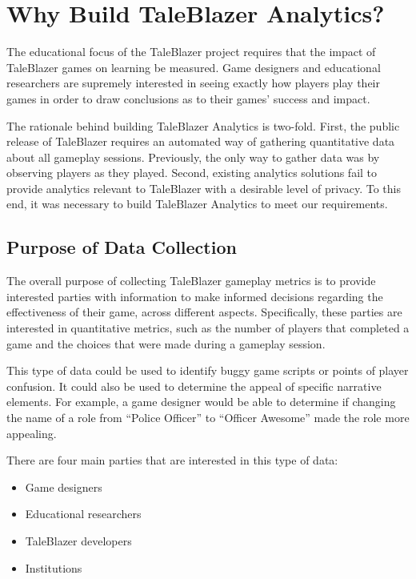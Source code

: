 \section{Why Build TaleBlazer Analytics?}

The educational focus of the TaleBlazer project requires that the impact of TaleBlazer games on learning be measured. Game designers and educational researchers are supremely interested in seeing exactly how players play their games in order to draw conclusions as to their games' success and impact.

The rationale behind building TaleBlazer Analytics is two-fold. First, the public release of TaleBlazer requires an automated way of gathering quantitative data about all gameplay sessions. Previously, the only way to gather data was by observing players as they played. Second, existing analytics solutions fail to provide analytics relevant to TaleBlazer with a desirable level of privacy. To this end, it was necessary to build TaleBlazer Analytics to meet our requirements.

\subsection{Purpose of Data Collection}

The overall purpose of collecting TaleBlazer gameplay metrics is to provide interested parties with information to make informed decisions regarding the effectiveness of their game, across different aspects. Specifically, these parties are interested in quantitative metrics, such as the number of players that completed a game and the choices that were made during a gameplay session. 

This type of data could be used to identify buggy game scripts or points of player confusion. It could also be used to determine the appeal of specific narrative elements. For example, a game designer would be able to determine if changing the name of a role from ``Police Officer'' to ``Officer Awesome'' made the role more appealing.

There are four main parties that are interested in this type of data: 
	\begin{itemize}
		\item Game designers
		\item Educational researchers
		\item TaleBlazer developers
		\item Institutions
	\end{itemize}

